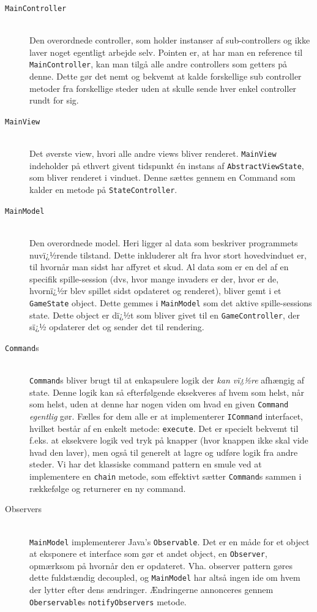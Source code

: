 \documentclass[titlepage,danish]{article}
\newcommand{\code}[1]{\texttt{#1}}
\begin{document}
\begin{description}
\item[\code{MainController}] \hfill \\
  Den overordnede controller, som holder instanser af sub-controllers og ikke laver noget egentligt
  arbejde selv. Pointen er, at har man en reference til \code{MainController}, kan man tilgå alle
  andre controllers som getters på denne. Dette gør det nemt og bekvemt at kalde forskellige sub
  controller metoder fra forskellige steder uden at skulle sende hver enkel controller rundt for
  sig.

\item[\code{MainView}]  \hfill \\
  Det øverste view, hvori alle andre views bliver renderet. \code{MainView} indeholder på ethvert
  givent tidspunkt én instans af \code{AbstractViewState}, som bliver renderet i vinduet. Denne
  sættes gennem en Command som kalder en metode på \code{StateController}.

\item[\code{MainModel}]  \hfill \\
  Den overordnede model. Heri ligger al data som beskriver programmets nuvï¿½rende tilstand. Dette
  inkluderer alt fra hvor stort hovedvinduet er, til hvornår man sidst har affyret et skud. Al data
  som er en del af en specifik spille-session (dvs, hvor mange invaders er der, hvor er de, hvornï¿½r
  blev spillet sidst opdateret og renderet), bliver gemt i et \code{GameState} object. Dette gemmes
  i \code{MainModel} som det aktive spille-sessions state. Dette object er dï¿½t som bliver givet til
  en \code{GameController}, der sï¿½ opdaterer det og sender det til rendering.

\item[\code{Command}s] \hfill \\
  \code{Command}s bliver brugt til at enkapsulere logik der \emph{kan vï¿½re} afhængig af state. Denne
  logik kan så efterfølgende eksekveres af hvem som helst, når som helst, uden at denne har nogen
  viden om hvad en given \code{Command} \emph{egentlig} gør. Fælles for dem alle er at implementerer
  \code{ICommand} interfacet, hvilket består af en enkelt metode: \code{execute}.  Det er specielt
  bekvemt til f.eks. at eksekvere logik ved tryk på knapper (hvor knappen ikke skal vide hvad den
  laver), men også til generelt at lagre og udføre logik fra andre steder.  Vi har det klassiske
  command pattern en smule ved at implementere en \code{chain} metode, som effektivt sætter
  \code{Command}s sammen i rækkefølge og returnerer en ny command.

\item[Observers] \hfill \\
  \code{MainModel} implementerer Java's \code{Observable}. Det er en måde for et object at eksponere
  et interface som gør et andet object, en \code{Observer}, opmærksom på hvornår den er
  opdateret. Vha. observer pattern gøres dette fuldstændig decoupled, og \code{MainModel} har altså
  ingen ide om hvem der lytter efter dens ændringer. Ændringerne annonceres gennem
  \code{Oberservable}s \code{notifyObservers} metode.
\end{description}
\end{document}
